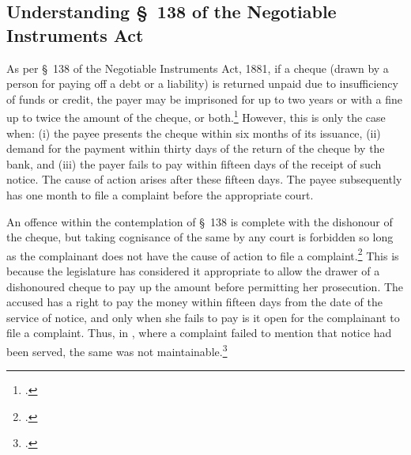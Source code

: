 \documentclass[12pt,a4paper]{article}
\begin{document}
\newpage
\begin{appendices}
 \section{Understanding \S~138 of the Negotiable Instruments Act} \label{app:understanding}

 As per \S~138 of the Negotiable Instruments Act, 1881, if a cheque (drawn by a person for paying off a debt or a liability) is returned unpaid due to insufficiency of funds or credit, the payer may be imprisoned for up to two years or with a fine up to twice the amount of the cheque, or both.\footcite[A \textit{cheque} is defined as per \S~6 of the NI Act. It is a bill of exchange drawn on a specified banker and not expressed to be payable otherwise than on-demand. It includes the electronic image of a truncated cheque and a cheque in electronic form. Once a cheque has been signed and issued in favour of the holder of the cheque, there is a statutory presumption \S~139 of NI Act that the cheque is issued in discharge of a legally enforceable debt or liability. However, said presumption is a rebuttable one. The issuer of the cheque can rebut that presumption by adducing credible evidence that the cheque was issued for some other purpose like security for a loan.][]{sc2018_murugun} However, this is only the case when: (i) the payee presents the cheque within six months of its issuance, (ii) demand for the payment within thirty days of the return of the cheque by the bank, and (iii) the payer fails to pay within fifteen days of the receipt of such notice. The cause of action arises after these fifteen days. The payee subsequently has one month to file a complaint before the appropriate court.
 
 An offence within the contemplation of \S~138 is complete with the dishonour of the cheque, but taking cognisance of the same by any court is forbidden so long as the complainant does not have the cause of action to file a complaint.\footcite{sc2014_dashrath} This is because the legislature has considered it appropriate to allow the drawer of a dishonoured cheque to pay up the amount before permitting her prosecution. The accused has a right to pay the money within fifteen days from the date of the service of notice, and only when she fails to pay is it open for the complainant to file a complaint. Thus, in , where a complaint failed to mention that notice had been served, the same was not maintainable.\footcite{sc2002_shakti}
 

\end{appendices}
\end{document}
